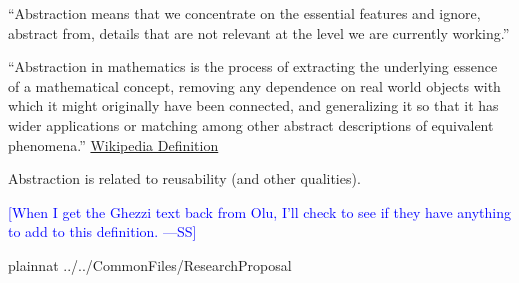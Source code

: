 \documentclass[letterpaper,cleveref]{lipics-v2019}
\newcommand{\authornote}[3]{\textcolor{#1}{[#3 ---#2]}}
\newcommand{\authornote}[3]{}
\newcommand{\wss}[1]{\authornote{blue}{SS}{#1}} %
\theoremstyle{definition}
\begin{document}
``Abstraction means that we concentrate on the essential features and ignore,
abstract from, details that are not relevant at the level we are currently
working.''  \cite[p.\ 296]{VanVliet2000}

``Abstraction in mathematics is the process of extracting the underlying essence
of a mathematical concept, removing any dependence on real world objects with
which it might originally have been connected, and generalizing it so that it
has wider applications or matching among other abstract descriptions of
equivalent phenomena.''
\href{https://en.wikipedia.org/wiki/Abstraction_(mathematics)} {Wikipedia
  Definition}

Abstraction is related to reusability (and other qualities).

\wss{When I get the Ghezzi text back from Olu, I'll check to see if they have
  anything to add to this definition.}

\newpage

 {plainnat}
 {../../CommonFiles/ResearchProposal}
\end{document}
